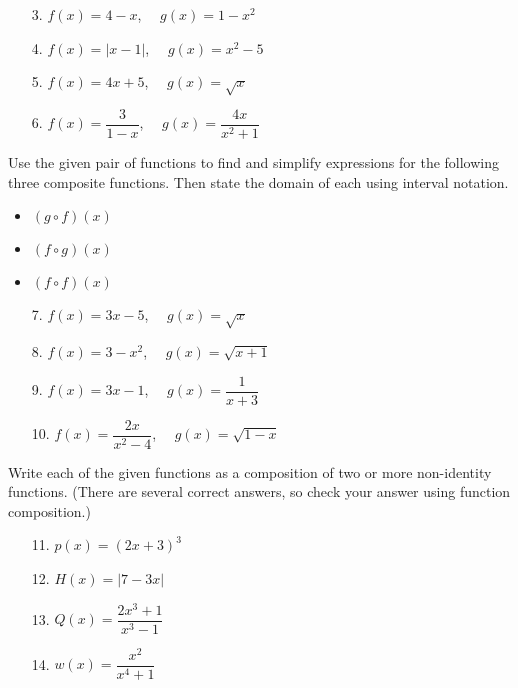 \documentclass[12pt]{article}
\theoremstyle{definition}
\begin{document}
\begin{multicols}{2}
\begin{enumerate}
\item[3.]  $f(x) = 4-x$, \ \ $g(x) = 1-x^2$\\
\item[4.]  $f(x) = |x-1|$, \ \ $g(x) = x^2-5$\\
\item[5.]  $f(x) = 4x+5$, \ \ $g(x) = \sqrt{x}$\\
\item[6.]  $f(x) = \dfrac{3}{1-x}$, \ \ $g(x) = \dfrac{4x}{x^2+1}$\\
\end{enumerate}
\end{multicols}

\newpage

Use the given pair of functions to find and simplify expressions for the following three composite functions.  Then state the domain of each using interval notation.

\begin{multicols}{3}
\begin{itemize}
\item  $(g \circ f)(x)$
\item  $(f \circ g)(x)$
\item  $(f \circ f)(x)$
\end{itemize}
\end{multicols}


\begin{multicols}{2}
\begin{enumerate}
\item[7.]  $f(x) = 3x-5$, \ \ $g(x) = \sqrt{x}$\\ 
\item[8.]  $f(x) = 3-x^2$, \ \ $g(x) = \sqrt{x+1}$\\ 
\item[9.]  $f(x) = 3x-1$, \ \ $g(x) = \dfrac{1}{x+3}$\\
\item[10.]  $f(x) =  \dfrac{2x}{x^2-4}$, \ \ $g(x) =\sqrt{1-x}$\\
\end{enumerate}
\end{multicols}

Write each of the given functions as a composition of two or more non-identity functions.  (There are several correct answers, so check your answer using function composition.)

\begin{multicols}{2}
\begin{enumerate}
\item[11.]  $p(x) = (2x+3)^3$\\
\item[12.]  $H(x) = |7-3x|$\\
\item[13.]  $Q(x) = \dfrac{2x^3+1}{x^3-1}$\\
\item[14.]  $w(x) = \dfrac{x^2}{x^4+1}$\\
\end{enumerate}
\end{multicols}
\end{document}
